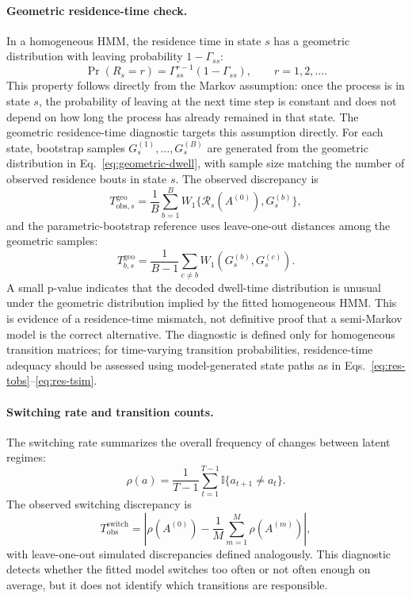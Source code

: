 \documentclass[11pt]{article}
\newcommand{\ind}{\mathbb{I}}
\begin{document}
\paragraph{Geometric residence-time check.}
In a homogeneous HMM, the residence time in state $s$ has a geometric
distribution with leaving probability $1-\Gamma_{ss}$:
\begin{equation}
  \Pr(R_s=r)
  =
  \Gamma_{ss}^{r-1}(1-\Gamma_{ss}),
  \qquad r=1,2,\ldots .
  \label{eq:geometric-dwell}
\end{equation}
This property follows directly from the Markov assumption: once the process is
in state $s$, the probability of leaving at the next time step is constant and
does not depend on how long the process has already remained in that state.
The geometric residence-time diagnostic targets this assumption directly. For
each state, bootstrap samples
$G_s^{(1)},\ldots,G_s^{(B)}$ are generated from the geometric distribution in
Eq.~\eqref{eq:geometric-dwell}, with sample size matching the number of
observed residence bouts in state $s$. The observed discrepancy is
\begin{equation*}
  T_{\mathrm{obs},s}^{\mathrm{geo}}
  =
  \frac{1}{B}\sum_{b=1}^{B}
  W_1\{\mathcal{R}_s(A^{(0)}),G_s^{(b)}\},
\end{equation*}
and the parametric-bootstrap reference uses leave-one-out distances among the
geometric samples:
\begin{equation*}
  T_{b,s}^{\mathrm{geo}}
  =
  \frac{1}{B-1}\sum_{c \ne b}
  W_1(G_s^{(b)},G_s^{(c)}).
\end{equation*}
A small p-value indicates that the decoded dwell-time distribution is unusual
under the geometric distribution implied by the fitted homogeneous HMM. This is
evidence of a residence-time mismatch, not definitive proof that a semi-Markov
model is the correct alternative. The diagnostic is defined only for
homogeneous transition matrices; for time-varying transition probabilities,
residence-time adequacy should be assessed using model-generated state paths as
in Eqs.~\eqref{eq:res-tobs}--\eqref{eq:res-tsim}.

\paragraph{Switching rate and transition counts.}
The switching rate summarizes the overall frequency of changes between latent
regimes:
\begin{equation*}
  \rho(a)
  =
  \frac{1}{T-1}
  \sum_{t=1}^{T-1}\ind\{a_{t+1}\ne a_t\}.
\end{equation*}
The observed switching discrepancy is
\begin{equation*}
  T_{\mathrm{obs}}^{\mathrm{switch}}
  =
  \left|
    \rho(A^{(0)})
    -
    \frac{1}{M}\sum_{m=1}^{M}\rho(A^{(m)})
  \right|,
\end{equation*}
with leave-one-out simulated discrepancies defined analogously. This diagnostic
detects whether the fitted model switches too often or not often enough on
average, but it does not identify which transitions are responsible.
\end{document}
